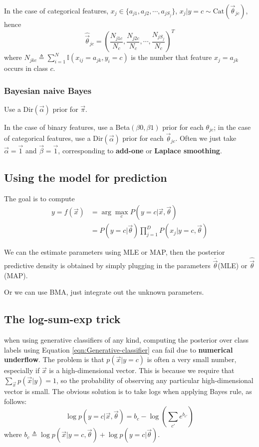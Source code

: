 In the case of categorical features, $x_j \in \{a_{j1},a_{j2},\cdots, a_{jS_j}\}$, $x_j|y=c \sim \text{Cat}(\vec{\theta}_{jc})$, hence
\begin{equation}
\hat{\vec{\theta}}_{jc}=(\dfrac{N_{j1c}}{N_c},\dfrac{N_{j2c}}{N_c}, \cdots, \dfrac{N_{jS_j}}{N_c})^T
\end{equation}
where $N_{jkc} \triangleq \sum\limits_{i=1}^N \mathbb{I}(x_{ij}=a_{jk}, y_i=c)$ is the number that feature $x_j=a_{jk}$ occurs in class $c$.


\subsubsection{Bayesian naive Bayes}
\label{sec:Bayesian-naive-Bayes}
Use a Dir$(\vec{\alpha})$ prior for $\vec{\pi}$.

In the case of binary features, use a Beta$(\beta0,\beta1)$ prior for each $\theta_{jc}$; in the case of categorical features, use a Dir$(\vec{\alpha})$ prior for each  $\vec{\theta}_{jc}$. Often we just take $\vec{\alpha}=\vec{1}$ and $\vec{\beta}=\vec{1}$, corresponding to \textbf{add-one} or \textbf{Laplace smoothing}.


\subsection{Using the model for prediction}
The goal is to compute
\begin{equation}\begin{split}
y=f(\vec{x}) & =\arg\max\limits_{c}{P(y=c|\vec{x},\vec{\theta})} \\
   & =P(y=c|\vec{\theta})\prod_{j=1}^D P(x_j|y=c,\vec{\theta})
\end{split}\end{equation}

We can the estimate parameters using MLE or MAP, then the posterior predictive density is obtained by simply plugging in the parameters $\bar{\vec{\theta}}$(MLE) or $\hat{\vec{\theta}}$(MAP). 

Or we can use BMA, just integrate out the unknown parameters.


\subsection{The log-sum-exp trick}
when using generative classifiers of any kind, computing the posterior over class labels using Equation \ref{eqn:Generative-classifier} can fail due to \textbf{numerical underflow}. The problem is that $p(\vec{x}|y=c)$ is often a very small number, especially if $\vec{x}$ is a high-dimensional vector. This is because we require that $\sum_{\vec{x}}p(\vec{x}|y)=1$, so the probability of observing any particular high-dimensional vector is small. The obvious solution is to take logs when applying Bayes rule, as follows:
\begin{equation}
\log p(y=c|\vec{x},\vec{\theta})=b_c-\log\left(\sum\limits_{c'}e^{b_{c'}}\right)
\end{equation}
where $b_c \triangleq \log p(\vec{x}|y=c,\vec{\theta})+\log p(y=c|\vec{\theta})$.

